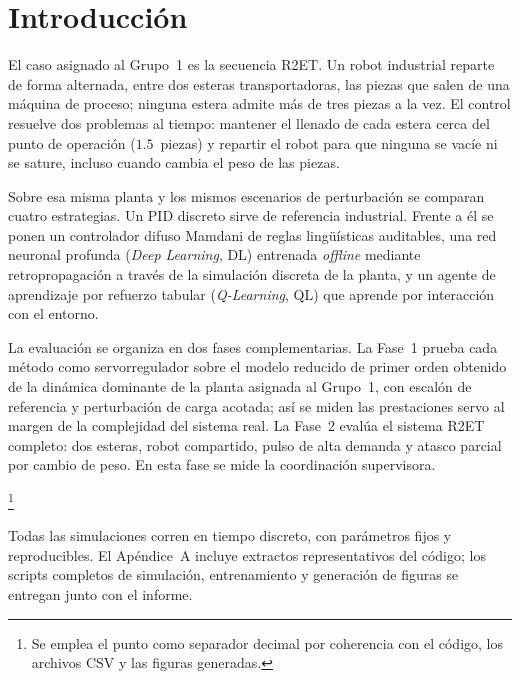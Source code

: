 \chapter{Introducción}
\label{ch:intro}

El caso asignado al Grupo~1 es la secuencia R2ET. Un robot industrial reparte de forma alternada, entre dos esteras transportadoras, las piezas que salen de una máquina de proceso; ninguna estera admite más de tres piezas a la vez. El control resuelve dos problemas al tiempo: mantener el llenado de cada estera cerca del punto de operación ($1.5$~piezas) y repartir el robot para que ninguna se vacíe ni se sature, incluso cuando cambia el peso de las piezas.

Sobre esa misma planta y los mismos escenarios de perturbación se comparan cuatro estrategias. Un PID discreto sirve de referencia industrial. Frente a él se ponen un controlador difuso Mamdani de reglas lingüísticas auditables, una red neuronal profunda (\emph{Deep Learning}, DL) entrenada \emph{offline} mediante retropropagación a través de la simulación discreta de la planta, y un agente de aprendizaje por refuerzo tabular (\emph{Q-Learning}, QL) que aprende por interacción con el entorno.

La evaluación se organiza en dos fases complementarias. La Fase~1 prueba cada método como servorregulador sobre el modelo reducido de primer orden obtenido de la dinámica dominante de la planta asignada al Grupo~1, con escalón de referencia y perturbación de carga acotada; así se miden las prestaciones servo al margen de la complejidad del sistema real. La Fase~2 evalúa el sistema R2ET completo: dos esteras, robot compartido, pulso de alta demanda y atasco parcial por cambio de peso. En esta fase se mide la coordinación supervisora.

\footnote{Se emplea el punto como separador decimal por coherencia con el código, los archivos CSV y las figuras generadas.}

Todas las simulaciones corren en tiempo discreto, con parámetros fijos y reproducibles. El Apéndice~A incluye extractos representativos del código; los scripts completos de simulación, entrenamiento y generación de figuras se entregan junto con el informe.
